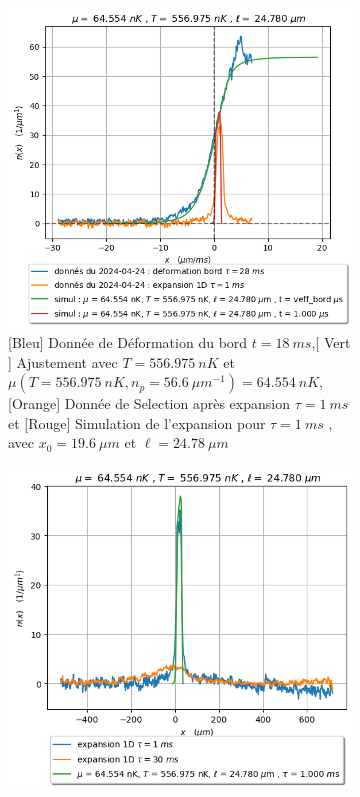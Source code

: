 \documentclass[a3, 10pt,twoside]{article}          %
\theoremstyle{plain}
\theoremstyle{definition}
\theoremstyle{remark}
\theoremstyle{definition} %
\begin{document}
		\begin{figure}[H]
			\begin{subfigure}[b]{0.45\textwidth}
        		\centering
        		\includegraphics[width=\textwidth]{Figures/simul_deformation_18_24-04-2024}
        		\caption{{\color{blue} [Bleu] Donnée de Déformation du bord $t= 18 ~ms$},{\color{OliveGreen}[ Vert ]  Ajustement avec $T = 556.975 ~nK$ et $\mu ( T =556.975 ~nK  , n_p = 56.6 ~{\mu m}^{-1} )= 64.554~nK$}, {\color{orange}[Orange] Donnée de Selection après expansion $\tau = 1~ms$} et {\color{red}[Rouge] Simulation de l'expansion pour $\tau= 1~ms$  , avec $x_0 = 19.6~\mu m$ et $\ell = 24.78~\mu m$ }  }
        		\label{fig4:ajustementdeform}
    		\end{subfigure}
    		\hfill
    		\begin{subfigure}[b]{0.45\textwidth}
        		\centering
        		\includegraphics[width=\textwidth]{Figures/simul_expansion_1_24-04-2024}

\end{subfigure}
\end{figure}
\end{document}
